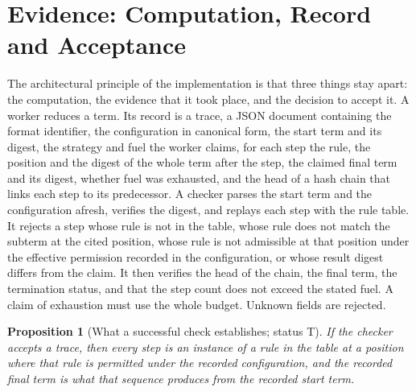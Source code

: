 \documentclass[11pt]{article}
\newtheorem{proposition}[theorem]{Proposition}
\theoremstyle{definition}
\theoremstyle{remark}
\newcommand{\Tt}{status T}
\begin{document}
\section{Evidence: Computation, Record and Acceptance}\label{sec:evidence}

The architectural principle of the implementation is that three things stay apart: the computation, the evidence that it took place, and the decision to accept it. A worker reduces a term. Its record is a trace, a JSON document containing the format identifier, the configuration in canonical form, the start term and its digest, the strategy and fuel the worker claims, for each step the rule, the position and the digest of the whole term after the step, the claimed final term and its digest, whether fuel was exhausted, and the head of a hash chain that links each step to its predecessor. A checker parses the start term and the configuration afresh, verifies the digest, and replays each step with the rule table. It rejects a step whose rule is not in the table, whose rule does not match the subterm at the cited position, whose rule is not admissible at that position under the effective permission recorded in the configuration, or whose result digest differs from the claim. It then verifies the head of the chain, the final term, the termination status, and that the step count does not exceed the stated fuel. A claim of exhaustion must use the whole budget. Unknown fields are rejected.

\begin{proposition}[What a successful check establishes; \Tt]\label{prop:check}
If the checker accepts a trace, then every step is an instance of a rule in the table at a position where that rule is permitted under the recorded configuration, and the recorded final term is what that sequence produces from the recorded start term.
\end{proposition}
\end{document}
